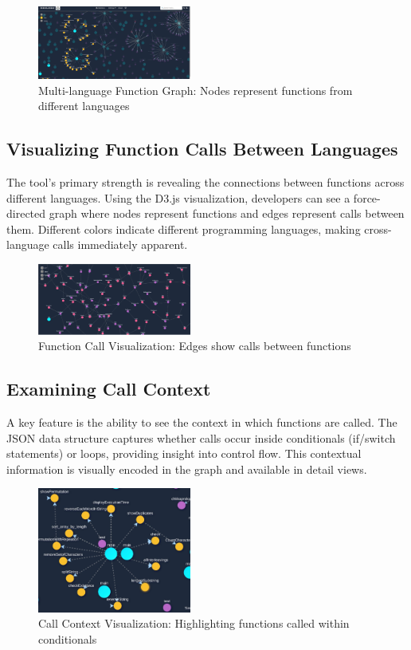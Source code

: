 \documentclass[10pt,twocolumn]{article}
\begin{document}
\begin{figure}[h]
    \centering
    \includegraphics[width=0.45\textwidth]{img1.jpeg}
    \caption{Multi-language Function Graph: Nodes represent functions from different languages}
\end{figure}

\subsection{Visualizing Function Calls Between Languages}

The tool's primary strength is revealing the connections between functions across different languages. Using the D3.js visualization, developers can see a force-directed graph where nodes represent functions and edges represent calls between them. Different colors indicate different programming languages, making cross-language calls immediately apparent.

\begin{figure}[h]
    \centering
    \includegraphics[width=0.45\textwidth]{img2.png}
    \caption{Function Call Visualization: Edges show calls between functions}
\end{figure}

\subsection{Examining Call Context}

A key feature is the ability to see the context in which functions are called. The JSON data structure captures whether calls occur inside conditionals (if/switch statements) or loops, providing insight into control flow. This contextual information is visually encoded in the graph and available in detail views.

\begin{figure}[h]
    \centering
    \includegraphics[width=0.45\textwidth]{img3.jpeg}
    \caption{Call Context Visualization: Highlighting functions called within conditionals}
\end{figure}
\end{document}
